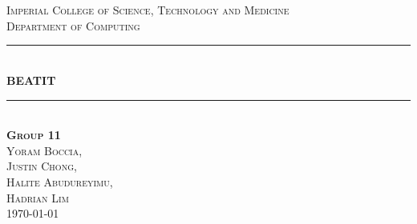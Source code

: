 \documentclass[a4paper]{article}
\begin{document}
\begin{titlepage}

\newcommand{\HRule}{\rule{\linewidth}{0.5mm}} %
\setlength{\topmargin}{0in}
\center %
 
 
 \begin{minipage}{0.4\textwidth}
\begin{flushleft} \large
\hspace*{-0.5cm}
\end{flushleft}
\end{minipage}
~
\begin{minipage}{0.5\textwidth}
\begin{flushright} \large
\hspace*{2cm}
\end{flushright}
\end{minipage}\\[1cm]

\textsc{\LARGE Imperial College of Science, Technology and Medicine}\\[1.5cm] %
\textsc{\Large Department of Computing}\\[0.5cm] %


\HRule \\[0.4cm]
{ \huge \bfseries BEATIT}\\[0.4cm] %
\HRule \\[1cm]
 

\textsc{{\large
\textbf{Group 11} \\
Yoram \textsc{Boccia}, \\
Justin \textsc{Chong}, \\ 
Halite \textsc{Abudureyimu}, \\
Hadrian \textsc{Lim} }}\\[0.5cm]


{\large \today}\\[0.5cm] %


\vfill %

\end{titlepage}
\end{document}
